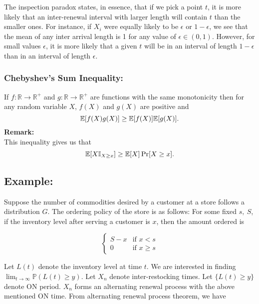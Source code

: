\documentclass[a4paper,10pt,english]{article}
\begin{document}
\begin{rem}
The inspection paradox states, in essence, that if we pick a point $t$, it is more likely that an inter-renewal interval with larger length will contain $t$ than the smaller ones. For instance, if $X_i$ were equally likely to be $\epsilon$ or $1-\epsilon$, we see that the mean of any inter arrival length is 1 for any value of $\epsilon\in(0,1)$. However, for small values $\epsilon$, it is more likely that a given $t$ will be in an interval of length $1-\epsilon$ than in an interval of length $\epsilon$.
\end{rem}

\subsubsection*{Chebyshev's Sum Inequality:}
 If $f:\mathbb{R} \rightarrow \mathbb{R}^{+}$ and $g : \mathbb{R} \rightarrow \mathbb{R}^{+}$ are functions with the same
 monotonicity then for any random variable $X$, $f(X)$ and $g(X)$ are positive and
 $$\mathbb{E}[f(X)g(X)] \geq \mathbb{E}[f(X)]\mathbb{E}[g(X)].$$
\textbf{Remark:} \\
 This inequality gives us that
 $$\mathbb{E}[X\mathbb{I}_{X\geq x}] \geq \mathbb{E}[X]\Pr[X\geq x].$$

\subsection{Example:}
 Suppose the number of commodities desired by a customer at a store follows a distribution $G$. The ordering policy of the store is as follows: For some fixed $s,~S$, if the inventory level after serving a customer is $x$, then the amount ordered is
 
 

     \begin{displaymath}
        \left\{
         \begin{array}{lr}
           S-x & \text{if } x <s\\
           0 & \text{if } x \geq s
         \end{array}
       \right.
    \end{displaymath} 

Let $L(t)$ denote the inventory level at time $t$. We are interested in finding $\lim_{t \rightarrow \infty}\mathbb{P}(L(t) \geq y)$. 
Let $X_n$ denote inter-restocking times. Let $\{L(t)\geq y\}$ denote ON period. $X_n$ forms an 
alternating renewal process with the above mentioned ON time. 
From alternating renewal process theorem, we have 
\end{document}
